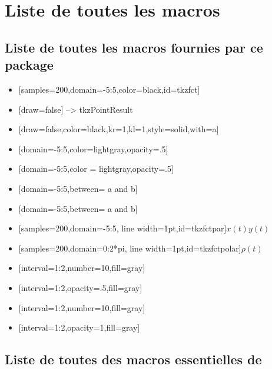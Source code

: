\section{Liste de toutes les macros}

\subsection{Liste de toutes les macros fournies par ce package} 

\begin{itemize}
\item {}[samples=200,domain=-5:5,color=black,id=tkzfct]
\item {}[draw=false] --> tkzPointResult  
\item {}[draw=false,color=black,kr=1,kl=1,style=solid,with=a] 
\item {}[domain=-5:5,color=lightgray,opacity=.5]
\item {}[domain=-5:5,color = lightgray,opacity=.5]
\item {}[domain=-5:5,between= a and b]
\item {}[domain=-5:5,between= a and b]                                                
\item {}[samples=200,domain=-5:5,
                             line width=1pt,id=tkzfctpar]{$x(t)$}{$y(t)$}
\item {}[samples=200,domain=0:2*pi,
                             line width=1pt,id=tkzfctpolar]{$\rho(t)$} 
\item {}[interval=1:2,number=10,fill=gray]
\item {} [interval=1:2,opacity=.5,fill=gray]  
\item {} [interval=1:2,number=10,fill=gray]  
\item {}[interval=1:2,opacity=1,fill=gray]  
\end{itemize}  

\subsection{Liste de toutes des macros essentielles de } 


